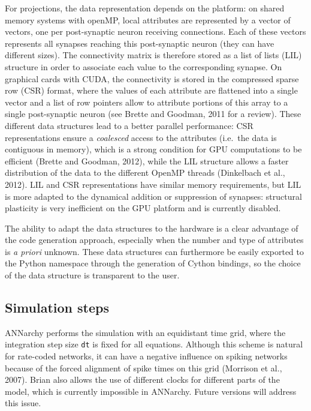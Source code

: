 \documentclass[
  11pt,
  a4paper,
]{scrbook}
\begin{document}
For projections, the data representation depends on the platform: on
shared memory systems with openMP, local attributes are represented by a
vector of vectors, one per post-synaptic neuron receiving connections.
Each of these vectors represents all synapses reaching this
post-synaptic neuron (they can have different sizes). The connectivity
matrix is therefore stored as a list of lists (LIL) structure in order
to associate each value to the corresponding synapse. On graphical cards
with CUDA, the connectivity is stored in the compressed sparse row (CSR)
format, where the values of each attribute are flattened into a single
vector and a list of row pointers allow to attribute portions of this
array to a single post-synaptic neuron (see Brette and Goodman, 2011 for
a review). These different data structures lead to a better parallel
performance: CSR representations ensure a \emph{coalesced} access to the
attributes (i.e.~the data is contiguous in memory), which is a strong
condition for GPU computations to be efficient (Brette and Goodman,
2012), while the LIL structure allows a faster distribution of the data
to the different OpenMP threads (Dinkelbach et al., 2012). LIL and CSR
representations have similar memory requirements, but LIL is more
adapted to the dynamical addition or suppression of synapses: structural
plasticity is very inefficient on the GPU platform and is currently
disabled.

The ability to adapt the data structures to the hardware is a clear
advantage of the code generation approach, especially when the number
and type of attributes is \emph{a priori} unknown. These data structures
can furthermore be easily exported to the Python namespace through the
generation of Cython bindings, so the choice of the data structure is
transparent to the user.

\subsection{Simulation steps}\label{sec-simulation-steps}

ANNarchy performs the simulation with an equidistant time grid, where
the integration step size \texttt{dt} is fixed for all equations.
Although this scheme is natural for rate-coded networks, it can have a
negative influence on spiking networks because of the forced alignment
of spike times on this grid (Morrison et al., 2007). Brian also allows
the use of different clocks for different parts of the model, which is
currently impossible in ANNarchy. Future versions will address this
issue.
\end{document}
